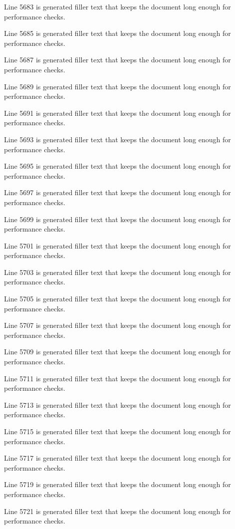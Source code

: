 Line 5683 is generated filler text that keeps the document long enough for performance checks.

Line 5685 is generated filler text that keeps the document long enough for performance checks.

Line 5687 is generated filler text that keeps the document long enough for performance checks.

Line 5689 is generated filler text that keeps the document long enough for performance checks.

Line 5691 is generated filler text that keeps the document long enough for performance checks.

Line 5693 is generated filler text that keeps the document long enough for performance checks.

Line 5695 is generated filler text that keeps the document long enough for performance checks.

Line 5697 is generated filler text that keeps the document long enough for performance checks.

Line 5699 is generated filler text that keeps the document long enough for performance checks.

Line 5701 is generated filler text that keeps the document long enough for performance checks.

Line 5703 is generated filler text that keeps the document long enough for performance checks.

Line 5705 is generated filler text that keeps the document long enough for performance checks.

Line 5707 is generated filler text that keeps the document long enough for performance checks.

Line 5709 is generated filler text that keeps the document long enough for performance checks.

Line 5711 is generated filler text that keeps the document long enough for performance checks.

Line 5713 is generated filler text that keeps the document long enough for performance checks.

Line 5715 is generated filler text that keeps the document long enough for performance checks.

Line 5717 is generated filler text that keeps the document long enough for performance checks.

Line 5719 is generated filler text that keeps the document long enough for performance checks.

Line 5721 is generated filler text that keeps the document long enough for performance checks.

